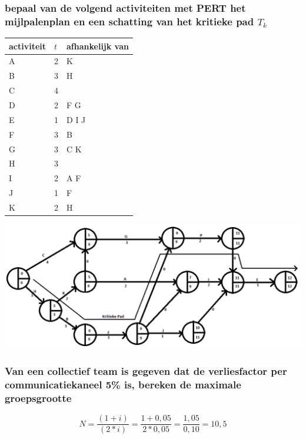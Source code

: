 \documentclass[a4paper,titlepage]{artikel1}
\begin{document}
   \subsubsection[Opdracht 2]{bepaal van de volgend activiteiten met PERT het mijlpalenplan en een schatting van het kritieke pad $T_k$}
   \begin{center}
     \begin{tabular}{|l|l|l|}
     \hline
     activiteit & $t$ & afhankelijk van \\
     \hline
     A & 2 & K \\
     B & 3 & H \\
     C & 4 &\\
     D & 2 & F G \\
     E & 1 & D I J \\
     F & 3 & B \\
     G & 3 & C K \\
     H & 3 & \\
     I & 2 & A F \\
     J & 1 & F \\
     K & 2 & H \\
     \hline
     \end{tabular}
     \includegraphics[scale=0.5]{H5O12.png}
   \end{center}
   \subsubsection[Opdracht 3]{Van een collectief team is gegeven dat de verliesfactor per communicatiekaneel 5\% is, bereken de maximale groepsgrootte}
   \begin{displaymath}
     N=\frac{(1+i)}{(2*i)}=\frac{1+0,05}{2*0,05}=\frac{1,05}{0,10}=10,5
   \end{displaymath}
\end{document}
